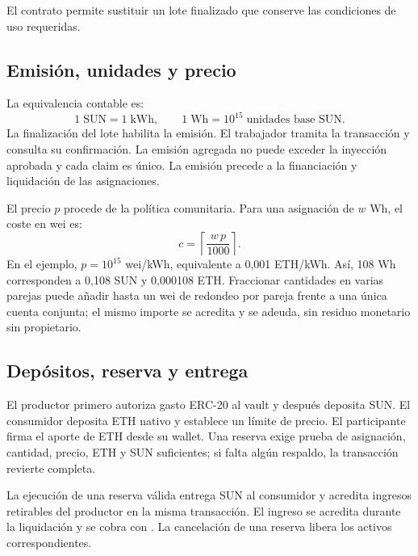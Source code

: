 El contrato permite sustituir un lote finalizado que conserve las condiciones de uso requeridas.

\subsection{Emisión, unidades y precio}
La equivalencia contable es:
\begin{equation}
1\;\text{SUN}=1\;\text{kWh},\qquad
1\;\text{Wh}=10^{15}\;\text{unidades base SUN}.
\end{equation}
La finalización del lote habilita la emisión. El trabajador tramita la transacción y consulta su confirmación. La emisión agregada no puede exceder la inyección aprobada y cada claim es único. La emisión precede a la financiación y liquidación de las asignaciones.

El precio $p$ procede de la política comunitaria. Para una asignación de $w$ Wh, el coste en wei es:
\begin{equation}
c=\left\lceil\frac{w\,p}{1000}\right\rceil.
\label{eq:coste}
\end{equation}
En el ejemplo, $p=10^{15}$ wei/kWh, equivalente a 0,001 ETH/kWh. Así, 108 Wh corresponden a 0,108 SUN y 0,000108 ETH. Fraccionar cantidades en varias parejas puede añadir hasta un wei de redondeo por pareja frente a una única cuenta conjunta; el mismo importe se acredita y se adeuda, sin residuo monetario sin propietario.

\subsection{Depósitos, reserva y entrega}
El productor primero autoriza gasto ERC-20 al vault y después deposita SUN. El consumidor deposita ETH nativo y establece un límite de precio. El participante firma el aporte de ETH desde su wallet. Una reserva exige prueba de asignación, cantidad, precio, ETH y SUN suficientes; si falta algún respaldo, la transacción revierte completa.

La ejecución de una reserva válida entrega SUN al consumidor y acredita ingresos retirables del productor en la misma transacción. El ingreso se acredita durante la liquidación y se cobra con . La cancelación de una reserva libera los activos correspondientes.

